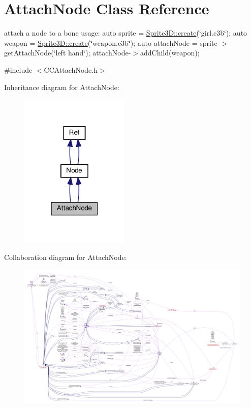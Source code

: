 \hypertarget{classAttachNode}{}\section{Attach\+Node Class Reference}
\label{classAttachNode}


attach a node to a bone usage\+: auto sprite = \hyperlink{classSprite3D_a10905e0480bfcf875882a9ad7b538d78}{Sprite3\+D\+::create}(\char`\"{}girl.\+c3b\char`\"{}); auto weapon = \hyperlink{classSprite3D_a10905e0480bfcf875882a9ad7b538d78}{Sprite3\+D\+::create}(\char`\"{}weapon.\+c3b\char`\"{}); auto attach\+Node = sprite-\/$>$get\+Attach\+Node(\char`\"{}left hand\char`\"{}); attach\+Node-\/$>$add\+Child(weapon);  




{\ttfamily \#include $<$C\+C\+Attach\+Node.\+h$>$}



Inheritance diagram for Attach\+Node\+:
\nopagebreak
\begin{figure}[H]
\begin{center}
\leavevmode
\includegraphics[width=148pt]{classAttachNode__inherit__graph}
\end{center}
\end{figure}


Collaboration diagram for Attach\+Node\+:
\nopagebreak
\begin{figure}[H]
\begin{center}
\leavevmode
\includegraphics[width=350pt]{classAttachNode__coll__graph}
\end{center}
\end{figure}
